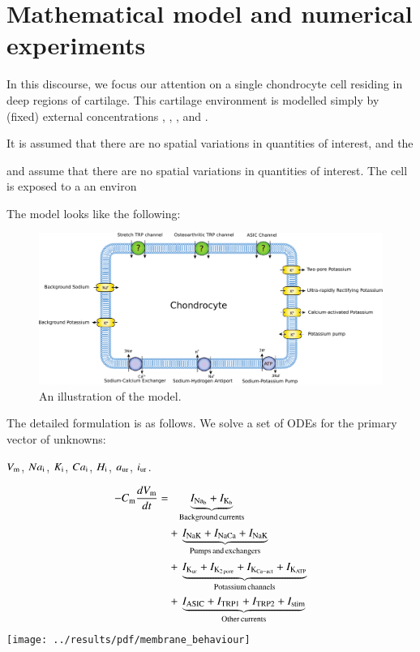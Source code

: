 \section{Mathematical model and numerical experiments}
\label{model}

In this discourse, we focus our attention on a single chondrocyte cell
residing in deep regions of cartilage. This cartilage environment is
modelled simply by (fixed) external concentrations \Nao, \Ko, \Cao,
and \Ho.


 It is assumed that there are no
spatial variations in quantities of interest, and the 

 and assume
that there are no spatial variations in quantities of interest. The
cell is exposed to a an environ

The model looks like the following:

\begin{figure}
  \centering
  \includegraphics[width=\textwidth]{../images/pdf/chondrocyte-model-cellml}
  \caption{An illustration of the model.}
  \label{fig:chondrocyte-model}
\end{figure}

The detailed formulation is as follows. We solve a set of ODEs for the primary vector of unknowns:

$V_{\rm m}$, $Na_{\rm i}$, $K_{\rm i}$, $Ca_{\rm i}$, $H_{\rm i}$,
$a_{\rm ur}$, $i_{\rm ur}$.


\begin{displaymath}
    \begin{split}
      -C_{\rm m} \frac{dV_{\rm m}}{dt} = & \phantom{+\,} \underbrace{I_{\rm Na_b} + I_{\rm K_b}}_{\rm Background\, currents}\\
      & +\, \underbrace{I_{\rm NaK} + I_{\rm NaCa} + I_{\rm NaK}}_{\rm Pumps\, and\, exchangers}\\
      & +\, \underbrace{I_{\rm K_{ur}} + I_{\rm K_{2\, pore}} + I_{\rm K_{Ca-act}} + I_{\rm K_{ATP}}}_{\rm Potassium\, channels}\\
      & +\, \underbrace{I_{\rm ASIC} + I_{\rm TRP1} + I_{\rm TRP2} + I_{\rm stim}}_{\rm Other\, currents}
    \end{split}
\end{displaymath}
\centering
\texttt{[image: ../results/pdf/membrane\_behaviour]}


